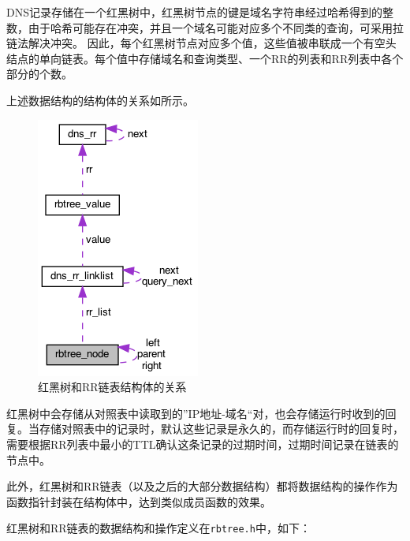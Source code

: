 \documentclass[lang=cn,11pt,a4paper,cite=authornum]{paper}
\begin{document}
DNS记录存储在一个红黑树中，红黑树节点的键是域名字符串经过哈希得到的整数，由于哈希可能存在冲突，并且一个域名可能对应多个不同类的查询，可采用拉链法解决冲突。
因此，每个红黑树节点对应多个值，这些值被串联成一个有空头结点的单向链表。每个值中存储域名和查询类型、一个RR的列表和RR列表中各个部分的个数。

上述数据结构的结构体的关系如所示。

\begin{figure}[htbp]

    \centering
    \includegraphics[width=0.3\linewidth]{./APIdoc/structrbtree__node__coll__graph.png}
    \caption{红黑树和RR链表结构体的关系\label{fig:rbtree_structure}}

\end{figure}

红黑树中会存储从对照表中读取到的”IP地址-域名“对，也会存储运行时收到的回复。当存储对照表中的记录时，默认这些记录是永久的，而存储运行时的回复时，需要根据RR列表中最小的TTL确认这条记录的过期时间，过期时间记录在链表的节点中。

此外，红黑树和RR链表（以及之后的大部分数据结构）都将数据结构的操作作为函数指针封装在结构体中，达到类似成员函数的效果。

红黑树和RR链表的数据结构和操作定义在\texttt{rbtree.h}中，如下：
\end{document}
